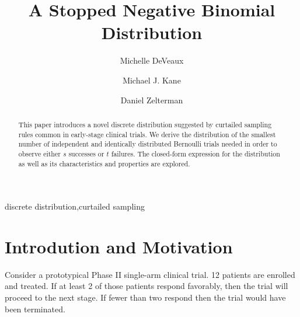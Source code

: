 \documentclass[review]{elsarticle}
\begin{document}
\begin{frontmatter}

\title{A Stopped Negative Binomial Distribution}


\author[mymainaddress]{Michelle DeVeaux}

\author[mymainaddress]{Michael J. Kane}

\author[mymainaddress]{Daniel Zelterman}

\address[mymainaddress]{Department of Biostatistics\\ School of Epidemiology and Public Health\\ Yale University, New Haven, CT}

\begin{abstract}
This paper introduces a novel discrete distribution suggested by curtailed
sampling rules common in early-stage clinical trials. We derive the
distribution of the smallest number of independent and identically
distributed Bernoulli trials needed in order to observe either $s$ successes 
or $t$ failures. The closed-form expression for the distribution as well as 
its characteristics and properties are explored.
\end{abstract}

\begin{keyword}
discrete distribution\sep curtailed sampling
\end{keyword}

\end{frontmatter}

\linenumbers

\section{Introdution and Motivation}

Consider a prototypical Phase II single-arm clinical trial. 12 patients
are enrolled and treated. If at least 2 of those patients respond
favorably, then the trial will proceed to the next stage. If fewer than 
two respond then the trial would have been terminated.
\end{document}

